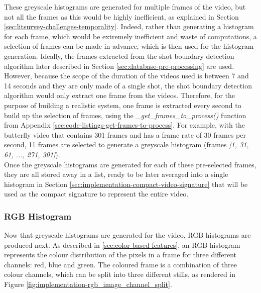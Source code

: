 These greyscale histograms are generated for multiple frames of the video, but not all the frames as this would be highly inefficient, as explained in Section \ref{sec:litsurvey-challenges-temporality}. Indeed, rather than generating a histogram for each frame, which would be extremely inefficient and waste of computations, a selection of frames can be made in advance, which is then used for the histogram generation. Ideally, the frames extracted from the shot boundary detection algorithm later described in Section \ref{sec:database-pre-processing} are used. However, because the scope of the duration of the videos used is between 7 and 14 seconds and they are only made of a single shot, the shot boundary detection algorithm would only extract one frame from the videos. Therefore, for the purpose of building a realistic system, one frame is extracted every second to build up the selection of frames, using the \textit{\_get\_frames\_to\_process()} function from Appendix \ref{sec:code-listings-get-frames-to-process}. For example, with the butterfly video that contains 301 frames and has a frame rate of 30 frames per second, 11 frames are selected to generate a greyscale histogram (frames \textit{[1, 31, 61, ..., 271, 301]}).\\

Once the greyscale histograms are generated for each of these pre-selected frames, they are all stored away in a list, ready to be later averaged into a single histogram in Section \ref{sec:implementation-compact-video-signature} that will be used as the compact signature to represent the entire video.


\subsubsection{RGB Histogram}

Now that greyscale histograms are generated for the video, RGB histograms are produced next. As described in \ref{sec:color-based-features}, an RGB histogram represents the colour distribution of the pixels in a frame for three different channels: red, blue and green. The coloured frame is a combination of three colour channels, which can be split into three different stills, as rendered in Figure \ref{fig:implementation-rgb_image_channel_split}.

